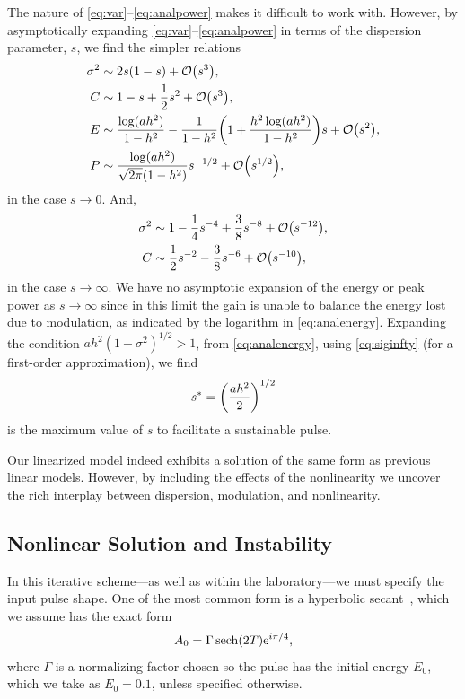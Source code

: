 \documentclass[9pt,twocolumn,twoside]{osajnl}
\let\originalleft\left
\let\originalright\right
\renewcommand{\left}{\mathopen{}\mathclose\bgroup\originalleft}
\renewcommand{\right}{\aftergroup\egroup\originalright}
\providecommand{\bigO}[1]{\ensuremath{\mathop{}\mathopen{}\mathcal{O}\mathopen{}\left(#1\right)}} %
\DeclareMathOperator{\sech}{sech}
\begin{document}
The nature of \eqref{eq:var}--\eqref{eq:analpower} makes it difficult to work with. However, by asymptotically expanding \eqref{eq:var}--\eqref{eq:analpower} in terms of the dispersion parameter, $s$, we find the simpler relations
\begin{align}
	\sigma^2 &\sim 2s(1 - s) + \bigO{s^3}, \\
	C &\sim 1 - s + \frac{1}{2}s^2 + \bigO{s^3}, \\
	E &\sim \frac{\log (a h^2)}{1 - h^2} - \frac{1}{1 - h^2} \left( 1 + \frac{h^2 \log(a h^2)}{1 - h^2}  \right) s + \bigO{s^2}, \\
	P &\sim \frac{\log(ah^2)}{\sqrt{2 \pi}(1 - h^2)} s^{-1/2} + \bigO{s^{1/2}},
\end{align}
in the case $s \rightarrow 0$. And,
\begin{align}
	\sigma^2 &\sim 1 - \frac{1}{4}s^{-4} + \frac{3}{8}s^{-8} + \bigO{s^{-12}}, \label{eq:siginfty}\\
	C &\sim \frac{1}{2}s^{-2} - \frac{3}{8}s^{-6} + \bigO{s^{-10}},
\end{align}
in the case $s \rightarrow \infty$. We have no asymptotic expansion of the energy or peak power as $s \rightarrow \infty$ since in this limit the gain is unable to balance the energy lost due to modulation, as indicated by the logarithm in \eqref{eq:analenergy}. Expanding the condition $a h^2 (1 - \sigma^2)^{1/2} > 1$, from \eqref{eq:analenergy}, using \eqref{eq:siginfty} (for a first-order approximation), we find 
\begin{align}
	s^* = \left( \frac{a h^2}{2} \right)^{1/2}
\end{align}
is the maximum value of $s$ to facilitate a sustainable pulse.

Our linearized model indeed exhibits a solution of the same form as previous linear models. However, by including the effects of the nonlinearity we uncover the rich interplay between dispersion, modulation, and nonlinearity.

\subsection{Nonlinear Solution and Instability}
\label{sec:nlresults}
In this iterative scheme---as well as within the laboratory---we must specify the input pulse shape. One of the most common form is a hyperbolic secant~\cite{coen1997, finot2008, rothenberg1989b, tomlinson1984}, which we assume has the exact form
\begin{align}
	A_0 = \Gamma \sech \left( 2 T \right) \textrm{e}^{i \pi / 4},
	\label{eq:nlA0}
\end{align}
where $\Gamma$ is a normalizing factor chosen so the pulse has the initial energy $E_0$, which we take as $E_0 = 0.1$, unless specified otherwise.
\end{document}
